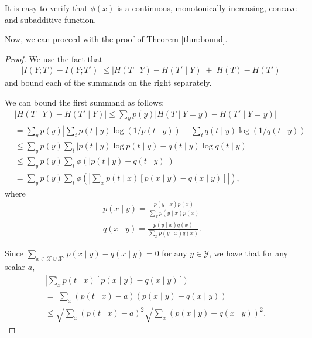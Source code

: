 \documentclass{article} \usepackage{iclr2021_conference,times}
\theoremstyle{definition}
\theoremstyle{remark}
\begin{document}
It is easy to verify that $\phi(x)$ is a continuous, monotonically increasing, concave and subadditive function.

Now, we can proceed with the proof of Theorem \ref{thm:bound}.

\begin{proof}
We use the fact that 
\begin{align}
    |I(Y;T) - I(Y;T')| \le |H(T\mid Y) - H(T' \mid Y)  |  + |H(T) - H(T')|
    \label{eq:init}
\end{align}
and bound each of the summands on the right separately.

We can bound the first summand as follows: 
\begin{align}
    & |H(T\mid Y) - H(T'\mid Y)| \le \sum_y p(y) |H(T\mid Y=y) - H(T' \mid Y=y)| \\ 
    &= \sum_y p(y) | \sum_t p(t\mid y) \log(1 / p(t\mid y)) - \sum_t q(t\mid y) \log(1 / q(t\mid y))| \\
    &\le \sum_y p(y) \sum_t |p(t \mid y) \log p(t\mid y) - q(t \mid  y) \log q(t\mid y)| \\
    &\le \sum_y p(y) \sum_t \phi(|p(t\mid y) - q(t \mid y)|) \\
    &= \sum_y p(y) \sum_t \phi(|\sum_x p(t \mid x)[p(x \mid y) -q( x \mid y)]|),
\end{align}
where 
\begin{align}
    p(x \mid y) = \frac{p(y \mid x) p(x)}{\sum_x p(y \mid x)p(x)} \\
    q(x \mid y) = \frac{p(y \mid x) q(x)}{\sum_x p(y \mid x)q(x)}.
\end{align}

Since $\sum_{x \in \mathcal{X} \cup \mathcal{X'}} p(x \mid y) - q(x \mid y) = 0$ for any $y \in \mathcal{Y}$, we have that for any scalar $a$,
\begin{align}
   & |\sum_x p(t \mid x)[p(x \mid y) -q( x \mid y)])| \\
    &=  |\sum_x (p(t \mid x) - a)(p(x \mid y) - q(x \mid y))| \\
    &\le \sqrt{\sum_x (p(t \mid x) -a )^2 } \sqrt{\sum_x (p(x \mid y) - q(x \mid y))^2}.
\end{align}


\end{proof}
\end{document}
